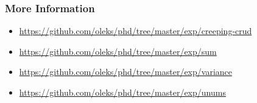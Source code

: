 \begin{frame}

\frametitle{More Information}

\begin{itemize}

\item \url{https://github.com/oleks/phd/tree/master/exp/creeping-crud}

\item \url{https://github.com/oleks/phd/tree/master/exp/sum}

\item \url{https://github.com/oleks/phd/tree/master/exp/variance}

\item \url{https://github.com/oleks/phd/tree/master/exp/unums}

\end{itemize}

\end{frame}
